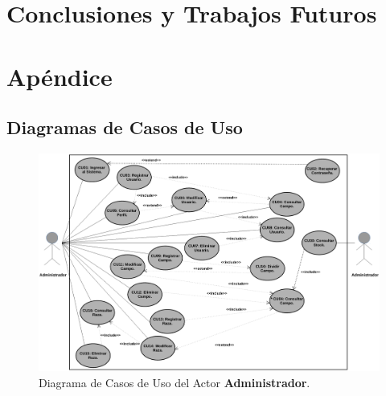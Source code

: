 \documentclass[11pt,oneside]{book}
\begin{document}
\chapter{Conclusiones y Trabajos Futuros}

\clearpage
\newpage
\chapter{Apéndice}\label{Ap}


\section{Diagramas de Casos de Uso}\label{ApDCU}
\begin{figure}[tbhp]
\centerline{\includegraphics[scale=0.5]{figs/capitulo_2_analisis/Diagrama_CU_Administrador.pdf}}
\caption{Diagrama de Casos de Uso del Actor \textbf{Administrador}.}
\label{Ap101}
\end{figure}
\end{document}
